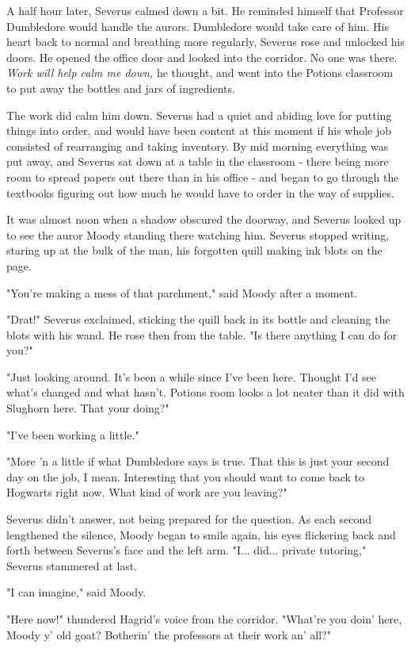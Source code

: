 A half hour later, Severus calmed down a bit. He reminded himself that Professor Dumbledore would handle the aurors. Dumbledore would take care of him. His heart back to normal and breathing more regularly, Severus rose and unlocked his doors. He opened the office door and looked into the corridor. No one was there. \emph{Work will help calm me down,} he thought, and went into the Potions classroom to put away the bottles and jars of ingredients.

The work did calm him down. Severus had a quiet and abiding love for putting things into order, and would have been content at this moment if his whole job consisted of rearranging and taking inventory. By mid morning everything was put away, and Severus sat down at a table in the classroom - there being more room to spread papers out there than in his office - and began to go through the textbooks figuring out how much he would have to order in the way of supplies.

It was almost noon when a shadow obscured the doorway, and Severus looked up to see the auror Moody standing there watching him. Severus stopped writing, staring up at the bulk of the man, his forgotten quill making ink blots on the page.

"You're making a mess of that parchment," said Moody after a moment.

"Drat!" Severus exclaimed, sticking the quill back in its bottle and cleaning the blots with his wand. He rose then from the table. "Is there anything I can do for you?"

"Just looking around. It's been a while since I've been here. Thought I'd see what's changed and what hasn't. Potions room looks a lot neater than it did with Slughorn here. That your doing?"

"I've been working a little."

"More 'n a little if what Dumbledore says is true. That this is just your second day on the job, I mean. Interesting that you should want to come back to Hogwarts right now. What kind of work are you leaving?"

Severus didn't answer, not being prepared for the question. As each second lengthened the silence, Moody began to smile again, his eyes flickering back and forth between Severus's face and the left arm. "I... did... private tutoring," Severus stammered at last.

"I can imagine," said Moody.

"Here now!" thundered Hagrid's voice from the corridor. "What're you doin' here, Moody y' old goat? Botherin' the professors at their work an' all?"

